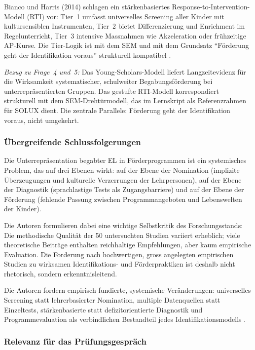 \documentclass[ngerman, a4paper]{article}
\begin{document}
Bianco und Harris (2014) schlagen ein stärkenbasiertes
Response-to-Intervention-Modell (RTI) vor: Tier~1 umfasst universelles
Screening aller Kinder mit kultursensiblen Instrumenten, Tier~2 bietet
Differenzierung und Enrichment im Regelunterricht, Tier~3 intensive
Massnahmen wie Akzeleration oder frühzeitige AP-Kurse. Die Tier-Logik ist
mit dem SEM und mit dem Grundsatz \enquote{Förderung geht der Identifikation
voraus} strukturell kompatibel
\parencite[S.\,444--454]{renzullireis2021rls}.

\textit{Bezug zu Frage~4 und~5:} Das Young-Scholars-Modell liefert
Langzeitevidenz für die Wirksamkeit systematischer, schulweiter
Begabungsförderung bei unterrepräsentierten Gruppen. Das gestufte
RTI-Modell korrespondiert strukturell mit dem SEM-Drehtürmodell, das im
Lernskript als Referenzrahmen für SOLUX dient. Die zentrale Parallele:
Förderung geht der Identifikation voraus, nicht umgekehrt.

\subsubsection*{Übergreifende Schlussfolgerungen}

Die Unterrepräsentation begabter EL in Förderprogrammen ist ein
systemisches Problem, das auf drei Ebenen wirkt: auf der Ebene der
Nomination (implizite Überzeugungen und kulturelle Verzerrungen der
Lehrpersonen), auf der Ebene der Diagnostik (sprachlastige Tests als
Zugangsbarriere) und auf der Ebene der Förderung (fehlende Passung
zwischen Programmangeboten und Lebenswelten der Kinder).

Die Autoren formulieren dabei eine wichtige Selbstkritik des
Forschungsstands: Die methodische Qualität der 50 untersuchten Studien
variiert erheblich; viele theoretische Beiträge enthalten reichhaltige
Empfehlungen, aber kaum empirische Evaluation. Die Forderung nach
hochwertigen, gross angelegten empirischen Studien zu wirksamen
Identifikations- und Förderpraktiken ist deshalb nicht rhetorisch,
sondern erkenntnisleitend.

Die Autoren
fordern empirisch fundierte, systemische Veränderungen: universelles
Screening statt lehrerbasierter Nomination, multiple Datenquellen statt
Einzeltests, stärkenbasierte statt defizitorientierte Diagnostik und
Programmevaluation als verbindlichen Bestandteil jedes
Identifikationsmodells \parencite[S.\,325]{mun2020identifying}.

\subsubsection*{Relevanz für das Prüfungsgespräch}
\end{document}

